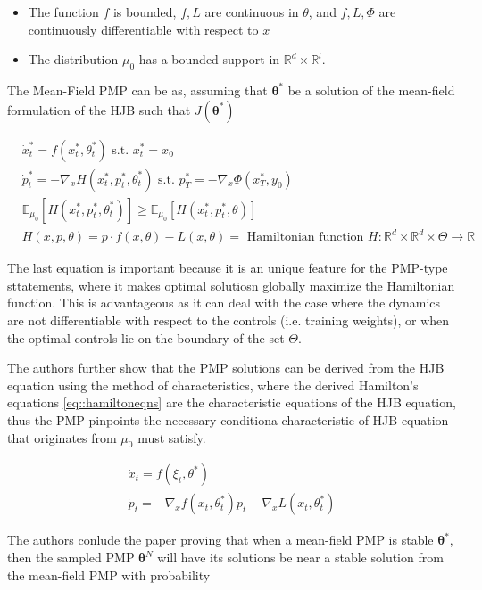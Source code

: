 \begin{itemize}
    \item The function $f$ is bounded, $f,L$ are continuous in $\theta$, and $f,L,\Phi$ are continuously differentiable with respect to $x$
    \item The distribution $\mu_0$ has a bounded support in $\mathbb{R}^d  \times \mathbb{R}^l$.
\end{itemize}

The Mean-Field PMP can be as, assuming that $\bm{\theta}^*$ be a solution of the mean-field formulation of the HJB such that $J(\bm{\theta}^*)$

\begin{align*}
    &\dot{x}_t^* = f(x_t^*, \theta_t^*) \text{ s.t. } x_t^* = x_0\\
    &\dot{p}_t^* = - \nabla_x H(x_t^*,p_t^*,\theta_t^*) \text{ s.t. } p_T^* = - \nabla_x \Phi(x_T^*, y_0) \\
    &\mathbb{E}_{\mu_0} [H(x_t^*,p_t^*,\theta_t^*)] \geq \mathbb{E}_{\mu_0} [H(x_t^*,p_t^*,\theta) ] \\
    &H(x,p,\theta) = p \cdot f(x,\theta) - L(x,\theta) = \text{ Hamiltonian function } H : \mathbb{R}^d \times \mathbb{R}^d \times \Theta \rightarrow \mathbb{R}
\end{align*}

The last equation is important because it is an unique feature for the PMP-type sttatements, where it makes optimal solutiosn globally maximize the Hamiltonian function. This is advantageous as it can deal with the case where the dynamics are not differentiable with respect to the controls (i.e. training weights), or when the optimal controls lie on the boundary of the set $\Theta$.

The authors further show that the PMP solutions can be derived from the HJB equation using the method of characteristics, where the derived Hamilton's equations \ref{eq::hamiltoneqns} are the characteristic equations of the HJB equation, thus the PMP pinpoints the necessary conditiona characteristic of HJB equation that originates from $\mu_0$ must satisfy.

\begin{align} \label{eq::hamiltoneqns}
    \dot{x}_t = f(\xi_t,\theta^*) \\
    \dot{p}_t = -\nabla_x f(x_t,\theta_t^*) p_t - \nabla_x L (x_t,\theta_t^*)
\end{align}

The authors conlude the paper proving that when a mean-field PMP is stable $\bm{\theta}^*$, then the sampled PMP $\bm{\theta}^N$ will have its solutions be near a stable solution from the mean-field PMP with probability

